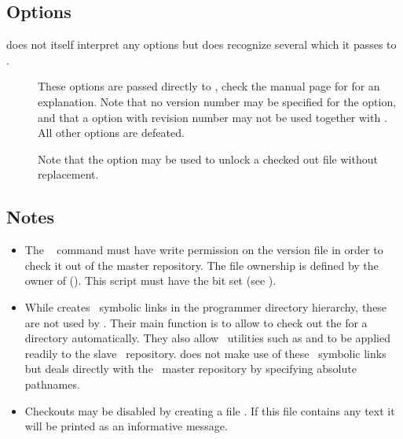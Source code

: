 \subsection*{Options}

 does not itself interpret any options but does recognize several
which it passes to .

\begin{description}
\item[]
   These options are passed directly to , check the manual page
   for  for an explanation.  Note that no version number may be
   specified for the  option, and that a  option with revision
   number may not be used together with .  All other 
   options are defeated.

   Note that the  option may be used to unlock a checked out file
   without replacement.
\end{description}

\subsection*{Notes}

\begin{itemize}
\item
   The \rcs\  command must have write permission on the version
   file in order to check it out of the master repository.  The file ownership
   is defined by the owner of  ().
   This script must have the  bit set (see ).

\item
   While  creates \rcs\ symbolic links in the programmer
   directory hierarchy, these are not used by .  Their main function
   is to allow  to check out the  for a directory
   automatically.  They also allow \rcs\ utilities such as 
   and  to be applied readily to the slave \rcs\ repository.
    does not make use of these \rcs\ symbolic links but deals directly
   with the \aipspp\ master repository by specifying absolute pathnames.

\item
   Checkouts may be disabled by creating a file .
   If this file contains any text it will be printed as an informative
   message.
\end{itemize}

